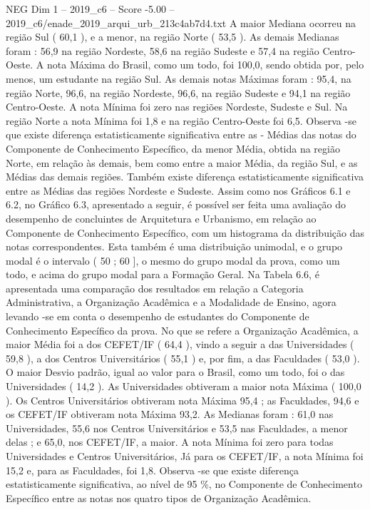 \begin{textsample}{NEG Dim 1 – 2019\_c6 – Score -5.00 – 2019\_c6/enade\_2019\_arqui\_urb\_213c4ab7d4.txt}
A maior Mediana ocorreu na região Sul ( 60,1 ), e a menor, na região Norte ( 53,5 ).
As demais Medianas foram : 56,9 na região Nordeste, 58,6 na região Sudeste e 57,4 na região Centro-Oeste.
A nota Máxima do Brasil, como um todo, foi 100,0, sendo obtida por, pelo menos, um estudante na região Sul.
As demais notas Máximas foram : 95,4, na região Norte, 96,6, na região Nordeste, 96,6, na região Sudeste e 94,1 na região Centro-Oeste.
A nota Mínima foi zero nas regiões Nordeste, Sudeste e Sul.
Na região Norte a nota Mínima foi 1,8 e na região Centro-Oeste foi 6,5.
Observa -se que existe diferença estatisticamente significativa entre as - Médias das notas do Componente de Conhecimento Específico, da menor Média, obtida na região Norte, em relação às demais, bem como entre a maior Média, da região Sul, e as Médias das demais regiões.
Também existe diferença estatisticamente significativa entre as Médias das regiões Nordeste e Sudeste.
Assim como nos Gráficos 6.1 e 6.2, no Gráfico 6.3, apresentado a seguir, é possível ser feita uma avaliação do desempenho de concluintes de Arquitetura e Urbanismo, em relação ao Componente de Conhecimento Específico, com um histograma da distribuição das notas correspondentes.
Esta também é uma distribuição unimodal, e o grupo modal é o intervalo ( 50 ; 60 ], o mesmo do grupo modal da prova, como um todo, e acima do grupo modal para a Formação Geral.
Na Tabela 6.6, é apresentada uma comparação dos resultados em relação a Categoria Administrativa, a Organização Acadêmica e a Modalidade de Ensino, agora levando -se em conta o desempenho de estudantes do Componente de Conhecimento Específico da prova.
No que se refere a Organização Acadêmica, a maior Média foi a dos CEFET/IF ( 64,4 ), vindo a seguir a das Universidades ( 59,8 ), a dos Centros Universitários ( 55,1 ) e, por fim, a das Faculdades ( 53,0 ).
O maior Desvio padrão, igual ao valor para o Brasil, como um todo, foi o das Universidades ( 14,2 ).
As Universidades obtiveram a maior nota Máxima ( 100,0 ).
Os Centros Universitários obtiveram nota Máxima 95,4 ; as Faculdades, 94,6 e os CEFET/IF obtiveram nota Máxima 93,2.
As Medianas foram : 61,0 nas Universidades, 55,6 nos Centros Universitários e 53,5 nas Faculdades, a menor delas ; e 65,0, nos CEFET/IF, a maior.
A nota Mínima foi zero para todas Universidades e Centros Universitários, Já para os CEFET/IF, a nota Mínima foi 15,2 e, para as Faculdades, foi 1,8.
Observa -se que existe diferença estatisticamente significativa, ao nível de 95 \%, no Componente de Conhecimento Específico entre as notas nos quatro tipos de Organização Acadêmica.

\end{textsample}
